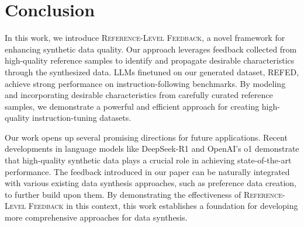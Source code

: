 \section{Conclusion}

In this work, we introduce \textsc{Reference-Level Feedback}, a novel framework for enhancing synthetic data quality. Our approach leverages feedback collected from high-quality reference samples to identify and propagate desirable characteristics through the synthesized data. LLMs finetuned on our generated dataset, \textsc{REFED}, achieve strong performance on instruction-following benchmarks. By modeling and incorporating desirable characteristics from carefully curated reference samples, we demonstrate a powerful and efficient approach for creating high-quality instruction-tuning datasets.

Our work opens up several promising directions for future applications. Recent developments in language models like DeepSeek-R1 \citep{deepseekai2025deepseekr1incentivizingreasoningcapability} and OpenAI's o1 \citep{openai2024openaio1card} demonstrate that high-quality synthetic data plays a crucial role in achieving state-of-the-art performance. The feedback introduced in our paper can be naturally integrated with various existing data synthesis approaches, such as preference data creation, to further build upon them. By demonstrating the effectiveness of \textsc{Reference-Level Feedback} in this context, this work establishes a foundation for developing more comprehensive approaches for data synthesis.